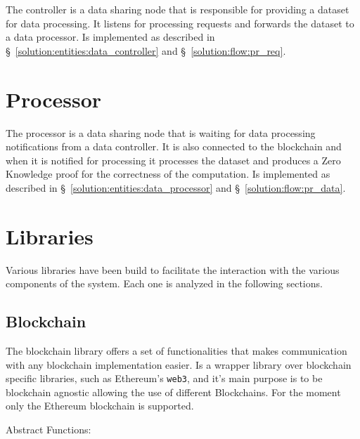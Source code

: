 The controller is a data sharing node that is responsible for providing a dataset for data processing. It listens for processing requests and forwards the dataset to a data processor. Is implemented as described in §~\ref{solution:entities:data_controller} and §~\ref{solution:flow:pr_req}.

\section{Processor}
\label{implemenation:processor}

The processor is a data sharing node that is waiting for data processing notifications from a data controller. It is also connected to the blockchain and when it is notified for processing it processes the dataset and produces a Zero Knowledge proof for the correctness of the computation. Is implemented as described in §~\ref{solution:entities:data_processor} and §~\ref{solution:flow:pr_data}.

\section{Libraries}
\label{implemenation:libs}

Various libraries have been build to facilitate the interaction with the various components of the system. Each one is analyzed in the following sections.

\subsection{Blockchain}
\label{implemenation:libs:bl}

The blockchain library offers a set of functionalities that makes communication with any blockchain implementation easier. Is a wrapper library over blockchain specific libraries, such as Ethereum's \verb|web3|, and it's main purpose is to be blockchain agnostic allowing the use of different Blockchains. For the moment only the Ethereum blockchain is supported.

Abstract Functions:

